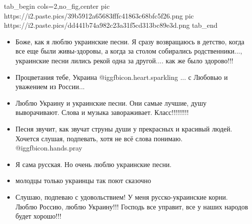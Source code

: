 \ifcmt
  tab_begin cols=2,no_fig,center
     pic https://i2.paste.pics/39b5912a65683fffc41863c68bfc5f26.png
		 pic https://i2.paste.pics/dd441b74a982c23a31f5cd313bc89e3d.png
  tab_end
\fi

\begin{itemize} %
\item Боже, как я люблю украинские песни. Я сразу возвращаюсь в детство, когда все
еще были живы-здоровы, а когда за столом собирались родственники..., украинские
песни лились рекой одна за другой.... как же было здорово!!!

\item Процветания тебе, Украина  @igg{fbicon.heart.sparkling} ... с Любовью и
уважением из России...

\item Люблю Украину и украинские песни. Они самые лучшие, душу выворачивают. Слова и
музыка завораживает. Класс!!!!!!!!!

\item Песня звучит, как звучат струны души у прекрасных и красивый людей. Хочется
слушая, подпевать, хотя  не  всё слова понимаю.  @igg{fbicon.hands.pray} 

\item Я сама русская. Но очень люблю украинские песни.

\item молодцы только украинцы так поют сказочно

\item Слушаю, подпеваю с удовольствием! У меня русско-украинские корни. Люблю Россию,
люблю Украину!!! Господь все управит, все у наших народов будет хорошо!!!
\end{itemize} %
